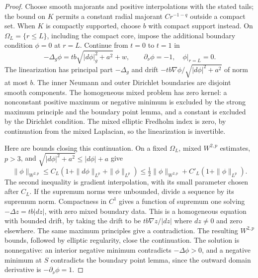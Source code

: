 \begin{proof}
Choose smooth majorants and positive interpolations with the stated
tails; the bound on $K$ permits a constant radial majorant $Cr^{-1-q}$
outside a compact set. When $K$ is compactly supported, choose $b$ with
compact support instead. On $\Omega_L=\{r\leq L\}$, including the
compact core, impose the additional boundary condition $\phi=0$ at
$r=L$. Continue from $t=0$ to $t=1$ in
\[
 -\Delta_g\phi=t b\sqrt{|d\phi|_g^2+a^2}+w,
 \qquad \partial_\nu\phi=-1,\quad \phi|_{r=L}=0.
\]
The linearization has principal part $-\Delta_g$ and drift
$-t b\nabla\phi/\sqrt{|d\phi|^2+a^2}$ of norm at most $b$.
The inner Neumann and outer Dirichlet boundaries are disjoint smooth
components. The homogeneous mixed problem has zero kernel: a
nonconstant positive maximum or negative minimum is excluded by the
strong maximum principle and the boundary point lemma, and a constant
is excluded by the Dirichlet condition. The mixed elliptic Fredholm
index is zero, by continuation from the mixed Laplacian, so the
linearization is invertible.

Here are bounds closing this continuation. On a fixed $\Omega_L$,
mixed $W^{2,p}$ estimates, $p>3$, and
$\sqrt{|d\phi|^2+a^2}\leq |d\phi|+a$ give
\[
 \|\phi\|_{W^{2,p}}
 \leq C_L(1+\|d\phi\|_{L^p}+\|\phi\|_{L^p})
 \leq \tfrac12\|\phi\|_{W^{2,p}}
          +C'_L(1+\|\phi\|_{L^p}).
\]
The second inequality is gradient interpolation, with its small
parameter chosen after $C_L$. If the supremum norms were unbounded,
divide a sequence by its supremum norm. Compactness in $C^1$ gives
a function of supremum one solving
$-\Delta z=t b|dz|$, with zero mixed boundary data. This is a
homogeneous equation with bounded drift, by taking the drift to be
$t b\nabla z/|dz|$ where $dz\ne0$ and zero elsewhere. The same
maximum principles give a contradiction. The resulting $W^{2,p}$
bounds, followed by elliptic regularity, close the continuation.
The solution is nonnegative: an interior negative minimum contradicts
$-\Delta\phi>0$, and a negative minimum at $S$ contradicts the boundary
point lemma, since the outward domain derivative is
$-\partial_\nu\phi=1$.


\end{proof}
